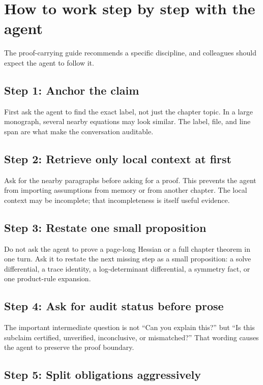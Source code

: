 \documentclass[12pt,a4paper,openany]{book}
\begin{document}
\section*{How to work step by step with the agent}

The proof-carrying guide recommends a specific discipline, and colleagues should
expect the agent to follow it.

\subsection*{Step 1: Anchor the claim}

First ask the agent to find the exact label, not just the chapter topic. In a
large monograph, several nearby equations may look similar. The label, file, and
line span are what make the conversation auditable.

\subsection*{Step 2: Retrieve only local context at first}

Ask for the nearby paragraphs before asking for a proof. This prevents the agent
from importing assumptions from memory or from another chapter. The local
context may be incomplete; that incompleteness is itself useful evidence.

\subsection*{Step 3: Restate one small proposition}

Do not ask the agent to prove a page-long Hessian or a full chapter theorem in
one turn. Ask it to restate the next missing step as a small proposition: a solve
differential, a trace identity, a log-determinant differential, a symmetry fact,
or one product-rule expansion.

\subsection*{Step 4: Ask for audit status before prose}

The important intermediate question is not ``Can you explain this?'' but ``Is
this subclaim certified, unverified, inconclusive, or mismatched?'' That wording
causes the agent to preserve the proof boundary.

\subsection*{Step 5: Split obligations aggressively}
\end{document}
